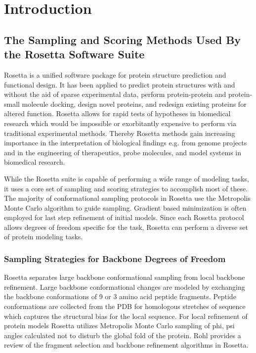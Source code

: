 \chapter{Introduction}
\section{The Sampling and Scoring Methods Used By the Rosetta Software Suite}
Rosetta is a unified software package for protein structure prediction and functional design.
It has been applied to predict protein structures with and without the aid of sparse experimental data, perform protein-protein and protein-small molecule docking, design novel proteins, and redesign existing proteins for altered function.
Rosetta allows for rapid tests of hypotheses in biomedical research which would be impossible or exorbitantly expensive to perform via traditional experimental methods.
Thereby Rosetta methods gain increasing importance in the interpretation of biological findings e.g. from genome projects and in the engineering of therapeutics, probe molecules, and model systems in biomedical research. 

While the Rosetta suite is capable of performing a wide range of modeling tasks, it uses a core set of sampling and scoring strategies to accomplish most of these. 
The majority of conformational sampling protocols in Rosetta use the Metropolis Monte Carlo algorithm to guide sampling.
Gradient based minimization is often employed for last step refinement of initial models.
Since each Rosetta protocol allows degrees of freedom specific for the task, Rosetta can perform a diverse set of protein modeling tasks\citep{Wang:2007du}.

\subsection{Sampling Strategies for Backbone Degrees of Freedom}
Rosetta separates large backbone conformational sampling from local backbone refinement.
Large backbone conformational changes are modeled by exchanging the backbone conformations of 9 or 3 amino acid peptide fragments.
Peptide conformations are collected from the PDB for homologous stretches of sequence\citep{Simons:1997do} which captures the structural bias for the local sequence\citep{Bystroff:1996vl}.
For local refinement of protein models Rosetta utilizes Metropolis Monte Carlo sampling of phi, psi angles calculated not to disturb the global fold of the protein.
Rohl\citep{Rohl:2004dh} provides a review of the fragment selection and backbone refinement algorithms in Rosetta. 

